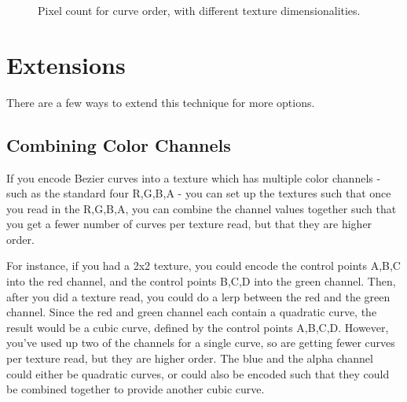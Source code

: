 \documentclass{jcgt}
\begin{document}
\begin{figure}

    \caption{Pixel count for curve order, with different texture dimensionalities.}
    \label{fig:pixelcount}
  \end{figure}

\section{Extensions}
\label{sec:extensions}

There are a few ways to extend this technique for more options.

\subsection{Combining Color Channels}

If you encode Bezier curves into a texture which has multiple color channels - such as the standard four R,G,B,A - you can set up the textures such that once you read in the R,G,B,A, you can combine the channel values together such that you get a fewer number of curves per texture read, but that they are higher order.

For instance, if you had a 2x2 texture, you could encode the control points A,B,C into the red channel, and the control points B,C,D into the green channel.  Then, after you did a texture read, you could do a lerp between the red and the green channel.  Since the red and green channel each contain a quadratic curve, the result would be a cubic curve, defined by the control points A,B,C,D.  However, you've used up two of the channels for a single curve, so are getting fewer curves per texture read, but they are higher order.  The blue and the alpha channel could either be quadratic curves, or could also be encoded such that they could be combined together to provide another cubic curve.
\end{document}
